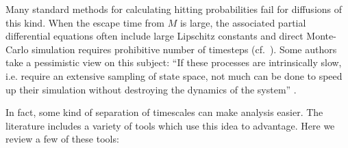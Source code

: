 \documentclass[12pt, nofootinbib,english, amsmath, amssymb, aps, priprint, graphicx,floatfix]{revtex4-1}
\theoremstyle{plain}
\theoremstyle{definition}
\theoremstyle{plain}
\begin{document}
Many standard methods for calculating hitting probabilities fail for diffusions of this kind.  When the escape time from $M$ is large, the associated partial differential equations often include large Lipschitz constants and direct Monte-Carlo simulation requires prohibitive number of timesteps (cf.\ \cite{Baum1986-we, Wille1987-tf, Machta2009-gh}).  Some authors take a pessimistic view on this subject: ``If these processes are intrinsically slow, i.e. require an extensive sampling of state space, not much can be done to speed up their simulation without destroying the dynamics of the system'' \cite{Christen2008-ge}.

In fact, some kind of separation of timescales can make analysis easier.   The literature includes a variety of tools which use this idea to advantage.  Here we review a few of these tools:
\end{document}
